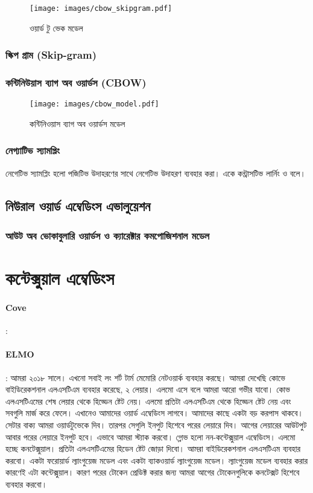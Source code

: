 \documentclass{article}[book]
\begin{document}
\begin{figure}[htbp] %
   \centering
   \texttt{[image: images/cbow\_skipgram.pdf]} 
   \caption{ওয়ার্ড টু ভেক মডেল}
   \label{fig:cbowskipgram}
\end{figure} 


\subsubsection{স্কিপ গ্রাম (Skip-gram)}
\subsubsection{কন্টিনিউয়াস ব্যাগ অব ওয়ার্ডস (CBOW)}
\begin{figure}[htbp] %
   \centering
   \texttt{[image: images/cbow\_model.pdf]} 
   \caption{কন্টিনিওয়াস ব্যাগ অব ওয়ার্ডস মডেল}
   \label{fig:cbow}
\end{figure} 

\subsubsection{নেগ্যাটিভ স্যামপ্লিং}
নেগেটিভ স্যামপ্লিং হলো পজিটিভ উদাহরণের সাথে নেগেটিভ উদাহরণ ব্যবহার করা। একে কন্ট্রাসটিভ লার্নিং ও বলে। 
\subsection{নিউরাল ওয়ার্ড এম্বেডিংস এভালুয়েশন }

\subsubsection{আউট অব ভোকাবুলারি ওয়ার্ডস ও ক্যারেক্টার কমপোজিশনাল মডেল}

\section{কন্টেক্সুয়াল এম্বেডিংস}
\paragraph{Cove}: 
\paragraph{ELMO}: আমরা ২০১৮ সালে। এখনো সবাই লং শর্ট টার্ম মেমোরি নেটওয়ার্ক ব্যবহার করছে। আমরা দেখেছি কোভে বাইডিরেকশনাল এলএসটিএম ব্যবহার করেছে, ২ লেয়ার। এলমো এসে বলে আমরা আরো গভীর যাবো। কোভ এলএসটিএমের শেষ লেয়ার থেকে হিড্ডেন ষ্টেট নেয়।  এলমো প্রতিটা এলএসটিএম থেকে হিড্ডেন ষ্টেট নেয় এবং সবগুলি মার্জ করে ফেলে। এখানেও আমাদের ওয়ার্ড এম্বেডিংস লাগবে। আমাদের কাছে একটা বড় করপাস থাকবে। সেটার বাক্য আমরা ওয়ার্ডটুভেকে দিব। তারপর সেগুলি ইনপুট হিশেবে পরের লেয়ারে দিব। আগের লেয়ারের আউটপুট আবার পরের লেয়ারে ইনপুট হবে। এভাবে আমরা স্ট্যাক করবো। গ্লোভ হলো নন-কন্টেক্সুয়াল এম্বেডিংস। এলমো হচ্ছে কনটেক্সুয়াল। প্রতিটা এলএসটিএমের হিডেন ষ্টেট জোড়া দিবো। আমরা বাইডিরেকশনাল এলএসটিএম ব্যবহার করবো। একটা ফরোয়ার্ড ল্যাংগুয়েজ মডেল এবং একটা ব্যাকওয়ার্ড ল্যাংগুয়েজ মডেল। ল্যাংগুয়েজ মডেল ব্যবহার করার কারণেই এটা কন্টেক্সুয়াল। কারণ পরের টোকেন প্রেডিক্ট করার জন্য আমরা আগের টোকেনগুলিকে কনটেক্সট হিশেবে ব্যবহার করবো। 
\end{document}
